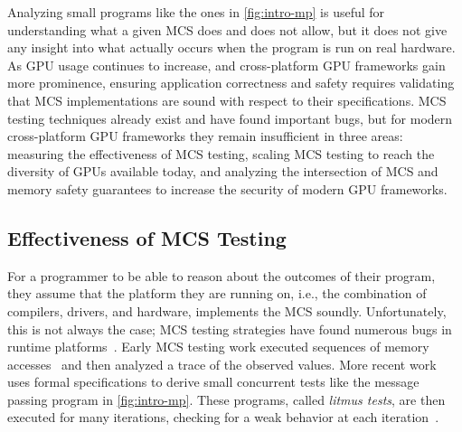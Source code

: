 Analyzing small programs like the ones in \myfig\ref{fig:intro-mp} is useful for understanding what a given MCS does and does not allow, but it does not give any insight into what actually occurs when the program is run on real hardware. As GPU usage continues to increase, and cross-platform GPU frameworks gain more prominence, ensuring application correctness and safety requires validating that MCS implementations are sound with respect to their specifications. MCS testing techniques already exist and have found important bugs, but for modern cross-platform GPU frameworks they remain insufficient in three areas: measuring the effectiveness of MCS testing, scaling MCS testing to reach the diversity of GPUs available today, and analyzing the intersection of MCS and memory safety guarantees to increase the security of modern GPU frameworks.

\subsection{Effectiveness of MCS Testing}

For a programmer to be able to reason about the outcomes of their program, they assume that the platform they are running on, i.e., the combination of compilers, drivers, and hardware, implements the MCS soundly. Unfortunately, this is not always the case; MCS testing strategies have found numerous bugs in runtime platforms~\cite{kirkham2020foundations,alglave2015gpu,manerkar2016counterexamples,manerkar2017rtlcheck,alglave2010fences}. Early MCS testing work executed sequences of memory accesses~\cite{archtest,hangal2004tsotool} and then analyzed a trace of the observed values.  More recent work uses formal specifications to derive small concurrent tests like the message passing program in \myfig\ref{fig:intro-mp}. These programs, called \textit{litmus tests}, are then executed for many iterations, checking for a weak behavior at each iteration~\cite{alglave2011litmus}.

